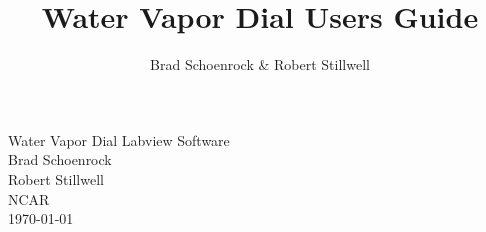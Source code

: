 \documentclass{report} %
\title{Water Vapor Dial Users Guide}
\author{Brad Schoenrock & Robert Stillwell}
\begin{document}
                    
\begin{center}
{\sc \LARGE Water Vapor Dial Labview Software} \\
\vspace{0.25in}
{\sc \Large Brad Schoenrock\\}
{\sc \Large Robert Stillwell\\}
\vspace{0.5in}
{\large NCAR
\\ \today}
\end{center}
\vspace{0.5in}
\thispagestyle{empty}

\newpage                               	%
\tableofcontents                     	%
\thispagestyle{empty}		%
\newpage      				%
\setcounter{page}{1}            	%

















\end{document}
